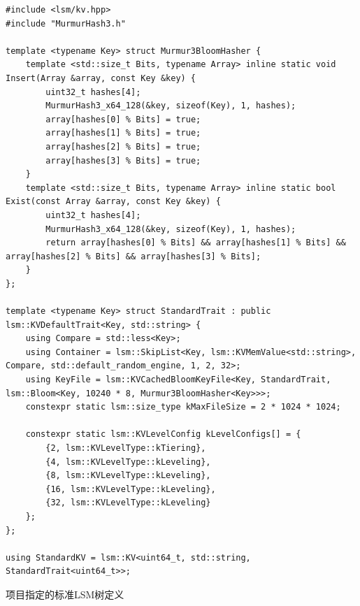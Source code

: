 \documentclass[a4paper,UTF8]{ctexart}
\newenvironment{code}{\captionsetup{type=listing}}{}
\begin{document}
\begin{code}
	\begin{verbatim}
#include <lsm/kv.hpp>
#include "MurmurHash3.h"

template <typename Key> struct Murmur3BloomHasher {
	template <std::size_t Bits, typename Array> inline static void Insert(Array &array, const Key &key) {
		uint32_t hashes[4];
		MurmurHash3_x64_128(&key, sizeof(Key), 1, hashes);
		array[hashes[0] % Bits] = true;
		array[hashes[1] % Bits] = true;
		array[hashes[2] % Bits] = true;
		array[hashes[3] % Bits] = true;
	}
	template <std::size_t Bits, typename Array> inline static bool Exist(const Array &array, const Key &key) {
		uint32_t hashes[4];
		MurmurHash3_x64_128(&key, sizeof(Key), 1, hashes);
		return array[hashes[0] % Bits] && array[hashes[1] % Bits] && array[hashes[2] % Bits] && array[hashes[3] % Bits];
	}
};

template <typename Key> struct StandardTrait : public lsm::KVDefaultTrait<Key, std::string> {
	using Compare = std::less<Key>;
	using Container = lsm::SkipList<Key, lsm::KVMemValue<std::string>, Compare, std::default_random_engine, 1, 2, 32>;
	using KeyFile = lsm::KVCachedBloomKeyFile<Key, StandardTrait, lsm::Bloom<Key, 10240 * 8, Murmur3BloomHasher<Key>>>;
	constexpr static lsm::size_type kMaxFileSize = 2 * 1024 * 1024;

	constexpr static lsm::KVLevelConfig kLevelConfigs[] = {
	    {2, lsm::KVLevelType::kTiering},
		{4, lsm::KVLevelType::kLeveling},
		{8, lsm::KVLevelType::kLeveling},
	    {16, lsm::KVLevelType::kLeveling},
		{32, lsm::KVLevelType::kLeveling}
	};
};

using StandardKV = lsm::KV<uint64_t, std::string, StandardTrait<uint64_t>>;
	\end{verbatim}
	\caption{项目指定的标准LSM树定义}
	\label{lst:StandardKVDef}
\end{code}
\end{document}
